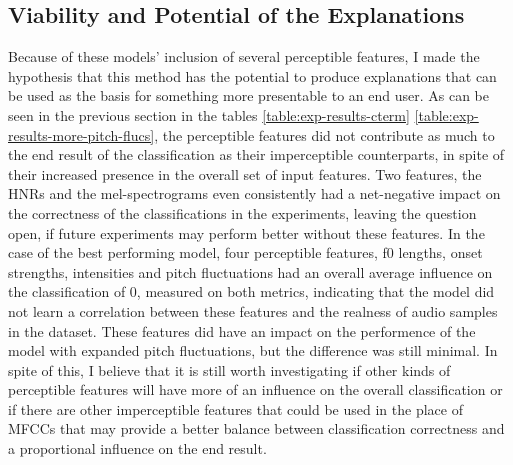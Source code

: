 \documentclass{article}
\begin{document}
		\subsection{Viability and Potential of the Explanations}
		Because of these models' inclusion of several perceptible features, I made the hypothesis
		that this method has the potential to produce explanations that can be used as the basis
		for something more presentable to an end user. As can be seen in the previous section in
		the tables \ref{table:exp-results-cterm} \ref{table:exp-results-more-pitch-flucs}, the
		perceptible features did not contribute as much to the end result of the classification as
		their imperceptible counterparts, in spite of their increased presence in the overall set
		of input features. Two features, the HNRs and the mel-spectrograms even consistently had a
		net-negative impact on the correctness of the classifications in the experiments, leaving
		the question open, if future experiments may perform better without these features. In the
		case of the best performing model, four perceptible features, f0 lengths, onset strengths,
		intensities and pitch fluctuations had an overall average influence on the classification
		of 0, measured on both metrics, indicating that the model did not learn a correlation
		between these features and the realness of audio samples in the dataset. These features
		did have an impact on the performence of the model with expanded pitch fluctuations, but
		the difference was still minimal. In spite of this, I believe that it is still worth
		investigating if other kinds of perceptible features will have more of an influence on the
		overall classification or if there are other imperceptible features that could be used in
		the place of MFCCs that may provide a better balance between classification correctness
		and a proportional influence on the end result.
\end{document}

